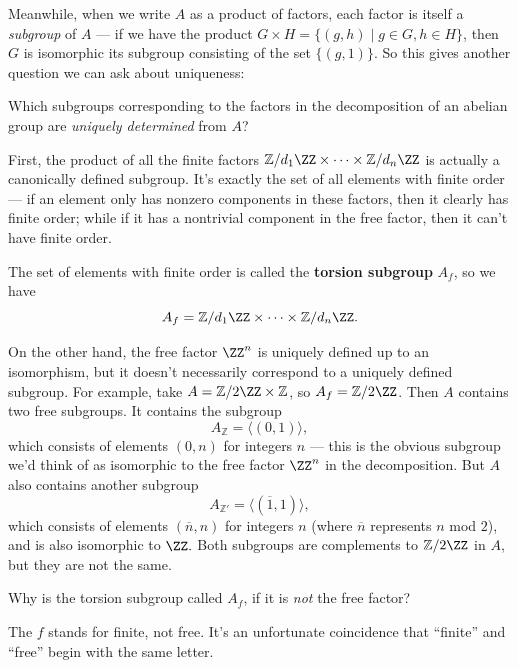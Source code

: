 Meanwhile, when we write $A$ as a product of factors, each factor is itself a \emph{subgroup} of $A$ --- if we have the product $G \times H = \{(g, h) \mid g \in G, h \in H\}$, then $G$ is isomorphic its subgroup consisting of the set $\{(g, 1)\}$. So this gives another question we can ask about uniqueness:

\begin{qq}
Which subgroups corresponding to the factors in the decomposition of an abelian group are \emph{uniquely determined} from $A$?
\end{qq}

First, the product of all the finite factors $\mathbb{Z}/d_1\ZZ \times \cdots \times \mathbb{Z}/d_n\ZZ$ is actually a canonically defined subgroup. It's exactly the set of all elements with finite order --- if an element only has nonzero components in these factors, then it clearly has finite order; while if it has a nontrivial component in the free factor, then it can't have finite order. 

\begin{definition}
    The set of elements with finite order is called the \textbf{torsion subgroup} $A_f$, so we have \[A_f = \mathbb{Z}/d_1\ZZ \times \cdots \times \mathbb{Z}/d_n\ZZ.\] 
\end{definition}

On the other hand, the free factor $\ZZ^n$ is uniquely defined up to an isomorphism, but it doesn't necessarily correspond to a uniquely defined subgroup. For example, take $A = \mathbb{Z}/2\ZZ \times \mathbb{Z}$, so $A_f = \mathbb{Z}/2\ZZ$. Then $A$ contains two free subgroups. It contains the subgroup \[A_{\mathbb{Z}} = \langle (0, 1)\rangle,\] which consists of elements $(0, n)$ for integers $n$ --- this is the obvious subgroup we'd think of as isomorphic to the free factor $\ZZ^n$ in the decomposition. But $A$ also contains another subgroup \[A_{\mathbb{Z}'} = \langle (\overline{1}, 1)\rangle,\] which consists of elements $(\overline{n}, n)$ for integers $n$ (where $\overline{n}$ represents $n$ mod $2$), and is also isomorphic to $\ZZ.$ Both subgroups are complements to $\mathbb{Z}/2\ZZ$ in $A$, but they are not the same. 

\begin{question}
Why is the torsion subgroup called $A_f$, if it is \emph{not} the free factor? 
\end{question}

\begin{ans}
The $f$ stands for finite, not free. It's an unfortunate coincidence that ``finite'' and ``free'' begin with the same letter.
\end{ans}

